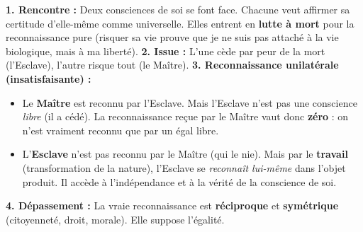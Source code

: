 \documentclass[11pt]{article}
\begin{document}
\begin{experience}
\textbf{1. Rencontre :} Deux consciences de soi se font face. Chacune veut affirmer sa certitude d'elle-même comme universelle. Elles entrent en \textbf{lutte à mort} pour la reconnaissance pure (risquer sa vie prouve que je ne suis pas attaché à la vie biologique, mais à ma liberté).
\textbf{2. Issue :} L'une cède par peur de la mort (l'Esclave), l'autre risque tout (le Maître).
\textbf{3. Reconnaissance unilatérale (insatisfaisante) :}
\begin{itemize}
    \item Le \textbf{Maître} est reconnu par l'Esclave. Mais l'Esclave n'est pas une conscience \emph{libre} (il a cédé). La reconnaissance reçue par le Maître vaut donc \textbf{zéro} : on n'est vraiment reconnu que par un égal libre.
    \item L'\textbf{Esclave} n'est pas reconnu par le Maître (qui le nie). Mais par le \textbf{travail} (transformation de la nature), l'Esclave se \emph{reconnaît lui-même} dans l'objet produit. Il accède à l'indépendance et à la vérité de la conscience de soi.
\end{itemize}
\textbf{4. Dépassement :} La vraie reconnaissance est \textbf{réciproque} et \textbf{symétrique} (citoyenneté, droit, morale). Elle suppose l'égalité.
\end{experience}
\end{document}
